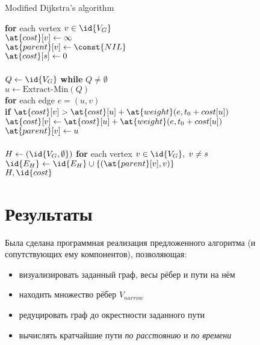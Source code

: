 \documentclass[12pt]{article}
\begin{document}
\begin{algorithm}
\caption{Modified Dijkstra's algorithm}
\begin{algorithmic}[1]

\State \textbf{for} each vertex $v \in \id{V_G}$ \\
    \qquad $\at{cost}[v] \gets \infty$ \\
    \qquad $\at{parent}[v] \gets \const{NIL}$ \\
$\at{cost}[s] \gets 0$ \\
\\
$Q \gets \id{V_G}$
\State \textbf{while} $Q \neq \emptyset$ \\
\qquad $u \gets \text{Extract-Min}(Q)$ \\
\qquad \textbf{for} each edge $e = (u,v)$ \\
\qquad \qquad \textbf{if} $\at{cost}[v] > \at{cost}[u] + \at{weight}(e, t_0 + cost[u])$ \\
\qquad \qquad \qquad $\at{cost}[v] \gets \at{cost}[u] + \at{weight}(e, t_0 + cost[u])$ \\
\qquad \qquad \qquad $\at{parent}[v] \gets u$ \\
\\
$H \gets (\id{V_G, \emptyset})$
\State \textbf{for} each vertex $v \in \id{V_G},\ v \neq s$ \\
    \qquad $\id{E_H} \gets \id{E_H} \cup \{(\at{parent}[v], v)\}$ \\
\Return $H, \id{cost}$
\end{algorithmic}
\end{algorithm}

\pagebreak
\section{Результаты}

Была сделана программная реализация предложенного алгоритма (и сопутствующих ему компонентов), позволяющая:

\begin{itemize}
    \item визуализировать заданный граф, весы рёбер и пути на нём 
    \item находить множество рёбер $V_{narrow}$
    \item редуцировать граф до окрестности заданного пути
    \item вычислять кратчайшие пути \textit{по расстоянию} и \textit{по времени}
\end{itemize}
\end{document}
